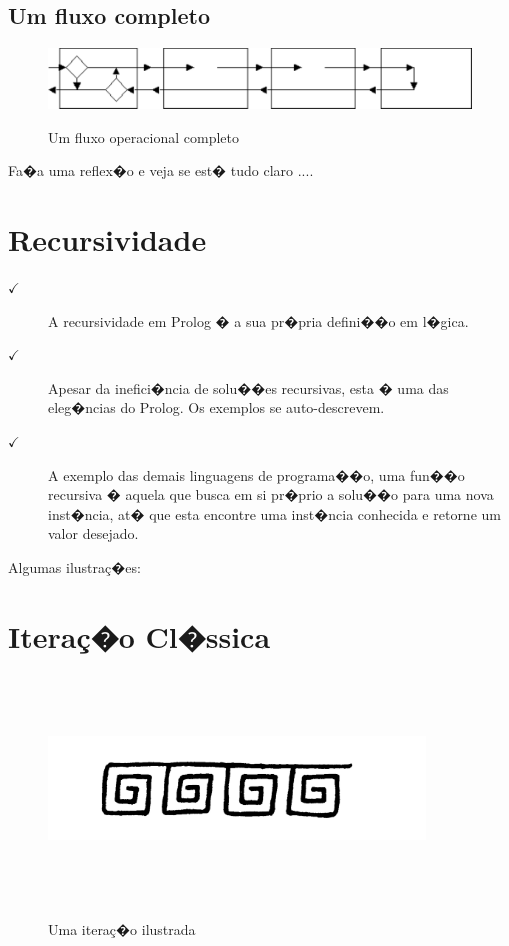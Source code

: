 \documentclass[final,a4paper]{article}
\begin{document}
\newpage
\subsection{Um fluxo  completo}

\vskip 3cm
\begin{figure}[!htb]
\centering
\includegraphics[scale=0.8]{figuras/fluxo_predicado_4_full.pdf}
%
\label{fig_fluxo_4}
\caption{Um fluxo operacional completo}
\end{figure}

Fa�a uma reflex�o e veja se est� tudo claro ....

\section{Recursividade}


\begin{description}

\item[$\checkmark $] A recursividade em Prolog � a sua 
pr�pria defini��o em l�gica. 

\item[$\checkmark $]  Apesar 
da inefici�ncia de solu��es recursivas, esta 
� uma das eleg�ncias do Prolog. Os  exemplos se auto-descrevem.

\item[$\checkmark $] A exemplo das demais linguagens de programa��o, uma
fun��o recursiva � aquela que busca em si pr�prio
a solu��o para uma nova inst�ncia, at� que esta
encontre uma inst�ncia conhecida e retorne um valor desejado.

\end{description}

Algumas ilustra\c{c}�es:

\section{Itera\c{c}�o Cl�ssica}


\begin{figure}[!htb]
\centering
\includegraphics[height=6cm, width=10cm]{figuras/iteracao_ilustra.pdf}
\label{fig_iteracao}
\caption{Uma itera\c{c}�o ilustrada}
\end{figure}
\end{document}
